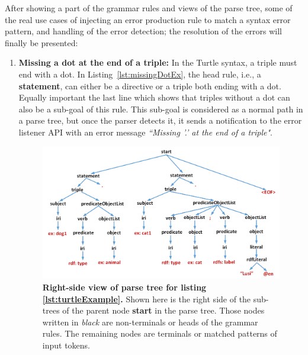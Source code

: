 After showing a part of the grammar rules and views of the parse tree, some of the real use cases of injecting an error production rule to match a syntax error pattern, and handling of the error detection; the resolution of the errors will finally be presented:
\begin{enumerate}
    \item \textbf{Missing a dot at the end of a triple:} In the Turtle syntax, a triple must end with a dot. 
    In Listing~\ref{lst:missingDotEx}, the head rule, i.e., a \textbf{statement}, can either be a directive or a triple both ending with a dot. 
    Equally important the last line which shows that triples without a dot can also be a sub-goal of this rule. 
    This sub-goal is considered as a normal path in a parse tree, but once the parser detects it, it sends a notification to the error listener API with an error message \emph{``Missing ’.’ at the end of a triple"}.  
    \begin{figure}
		\includegraphics[width=1\linewidth]{images/implementationParseTreeRight.png}
	\caption{\textbf{Right-side view of parse tree  for listing \ref{lst:turtleExample}.} Shown here is the right side of the sub-trees of the parent node \textbf{start} in the parse tree. Those nodes written in \emph{black} are non-terminals or heads of the grammar rules. The remaining nodes are terminals or matched patterns of input tokens.}
	\label{Fig:implementationParseTreeRight}

\end{figure}
    

\end{enumerate}
